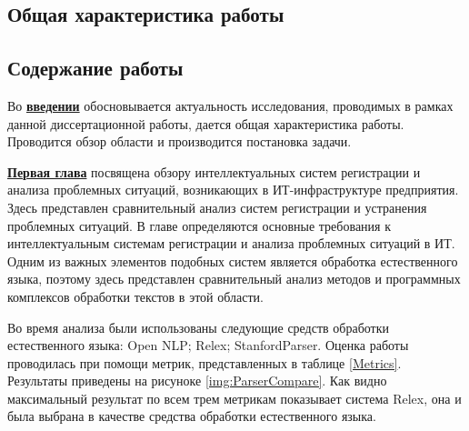 \subsection*{Общая характеристика работы}

\newcommand{\actuality}{\underline{\textbf{Актуальность темы.}}}
\newcommand{\aim}{\underline{\textbf{Целью}}}
\newcommand{\tasks}{\underline{\textbf{задачи}}}
\newcommand{\scope}{\underline{\textbf{Область исследования}}}
\newcommand{\subject}{\underline{\textbf{Предметом исследования}}}
\newcommand{\methods}{\underline{\textbf{Методы исследования}}}
\newcommand{\defpositions}{\underline{\textbf{Основные положения, выносимые на~защиту:}}}
\newcommand{\novelty}{\underline{\textbf{Научная новизна:}}}
\newcommand{\influence}{\underline{\textbf{Практическая значимость.}}}
\newcommand{\reliability}{\underline{\textbf{Достоверность}}}
\newcommand{\probation}{\underline{\textbf{Апробация работы.}}}
\newcommand{\contribution}{\underline{\textbf{Личный вклад.}}}
\newcommand{\publications}{\underline{\textbf{Публикации.}}}




\subsection*{Содержание работы}
Во \underline{\textbf{введении}} обосновывается актуальность исследования, проводимых в рамках данной диссертационной работы, дается общая характеристика работы. Проводится обзор области и производится постановка задачи. \par
\underline{\textbf{Первая глава}} посвящена обзору интеллектуальных систем регистрации и анализа проблемных ситуаций, возникающих в ИТ-инфраструктуре предприятия. Здесь представлен сравнительный анализ систем регистрации и устранения проблемных ситуаций. В главе определяются основные требования к интеллектуальным системам регистрации и анализа проблемных ситуаций в ИТ. Одним из важных элементов подобных систем является обработка естественного языка, поэтому здесь представлен сравнительный анализ методов и программных комплексов обработки текстов в этой области. \par
Во время анализа были использованы следующие средств обработки естественного языка: Open NLP; Relex; StanfordParser.
Оценка работы проводилась при помощи метрик, представленных в таблице \ref{Metrics}. Результаты приведены на рисуноке \ref{img:ParserCompare}. Как видно максимальный результат по всем трем метрикам показывает система Relex, она и была выбрана в качестве средства обработки естественного языка.

